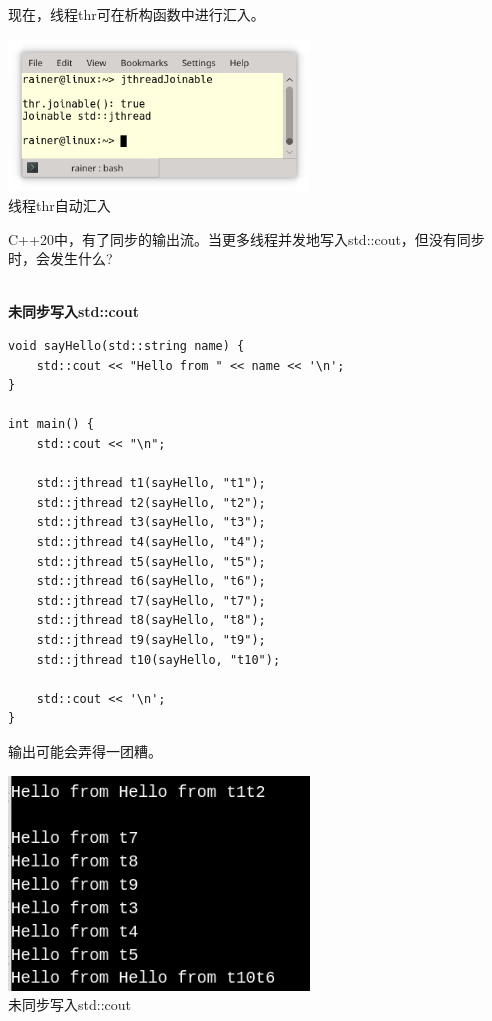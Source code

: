 现在，线程thr可在析构函数中进行汇入。

\begin{center}
\includegraphics[width=0.6\textwidth]{content/2/chapter3/images/10.png}\\
线程thr自动汇入
\end{center}


C++20中，有了同步的输出流。当更多线程并发地写入std::cout，但没有同步时，会发生什么?

\hspace*{\fill} \\ %
\noindent
\textbf{未同步写入std::cout}
\begin{lstlisting}[style=styleCXX]
void sayHello(std::string name) {
	std::cout << "Hello from " << name << '\n';
}

int main() {
	std::cout << "\n";
	
	std::jthread t1(sayHello, "t1");
	std::jthread t2(sayHello, "t2");
	std::jthread t3(sayHello, "t3");
	std::jthread t4(sayHello, "t4");
	std::jthread t5(sayHello, "t5");
	std::jthread t6(sayHello, "t6");
	std::jthread t7(sayHello, "t7");
	std::jthread t8(sayHello, "t8");
	std::jthread t9(sayHello, "t9");
	std::jthread t10(sayHello, "t10");
	
	std::cout << '\n';
}
\end{lstlisting}

输出可能会弄得一团糟。

\begin{center}
\includegraphics[width=0.6\textwidth]{content/2/chapter3/images/11.png}\\
未同步写入std::cout
\end{center}

